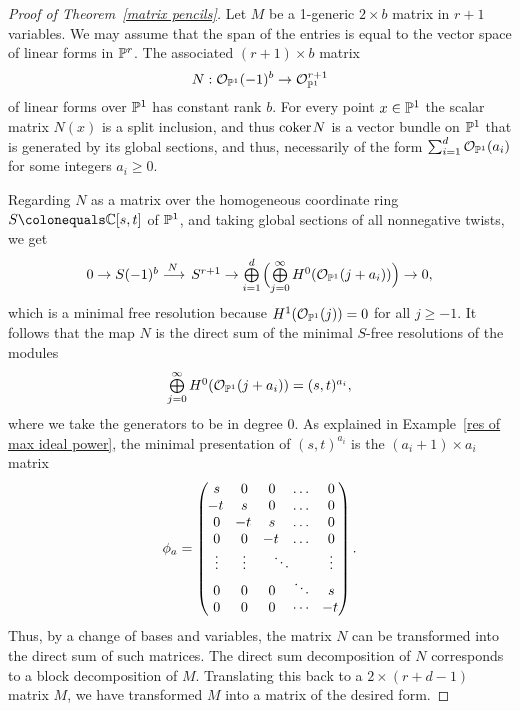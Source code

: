 \begin{proof}[Proof of Theorem~\ref{matrix pencils}]
Let $M$ be a 1-generic $2\times b$ matrix in $r+1$ variables. We may
assume that the span of the entries
is equal to the vector space of linear forms in ${\mathbb P}^{r}$. The associated
$(r+1)\times b$ matrix
$$
N: {\mathcal O}_{{\mathbb P}^{1}}(-1)^{b} \to {\mathcal O}_{{\mathbb P}^{1}}^{r+1}
$$
of linear forms over ${\mathbb P}^{1}$ has constant rank $b$.
For every point $x\in {\mathbb P}^{1}$ the scalar matrix $N(x)$ is a split
inclusion, and thus
${\rm{coker}\kern1pt} N$ is a vector bundle on ${\mathbb P}^{1}$ that is generated by its global sections, and thus, necessarily of the form $\sum_{i
=1}^{d}{\mathcal O}_{{\mathbb P}^{1}}(a_{i})$ for some
integers $a_{i}\geq 0$.

Regarding $N$ as a matrix over the homogeneous coordinate ring $S\colonequals \CC[s,t]$ of ${\mathbb P}^{1}$, and taking global sections of all
nonnegative twists, we get
$$
\tsty
0\to S(-1)^{b} \ruto {\,N}
S^{r+1}  \to \bigoplus\limits_{i = 1}^{d}\,\Bigl(
\bigoplus\limits_{j=0}^{\infty}H^{0}(\sO_{\PP^{1}}(j+a_{i}))\Bigr)\to 0,
$$
which is a minimal free resolution because $H^{1}({\mathcal O}_{{\mathbb P}^{1}}(j)) = 0$ for all $j\geq -1$.
It follows that the map $N$ is the direct
sum of the minimal $S$-free resolutions
of the modules
$$
\textstyle
\bigoplus\limits_{j=0}^{\infty}H^{0}({\mathcal O}_{{\mathbb P}^{1}}(j+a_{i})) = (s,t)^{a_{i}},
$$
where we take the generators to be in degree 0.
As 
explained
in Example~\ref{res of max ideal power}, the minimal
presentation of $(s,t)^{a_{i}}$ is the $(a_{i}+1)\times a_{i}$ matrix
\label{phia}$$
\phi_a=
\left(\,
\begin{matrix}
s&0&0&\dots&0\\
\!-t&s&0&\dots&0\\
0&\!-t&s&\dots&0\\
0&0&\!-t&\dots&0\\
\vdots&\vdots&\rlap{\,$\ddots$}&&\vdots\\
0&0&0&\ddots&s\\
0&0&0&\cdots&\!-t\\
\end{matrix}
\right)
.
$$
 Thus, by a change of bases and variables, the matrix $N$ can be
transformed into the direct sum of such matrices.
The direct sum decomposition of $N$ corresponds to a block decomposition
of $M$. Translating this
back to a $2\times (r+d-1)$ matrix $M$, we have
transformed $M$ into a matrix of
the desired form.
\end{proof}

